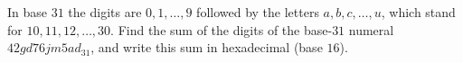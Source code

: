 In base $31$ the digits are $0,1,\ldots,9$ followed by the letters $a,b,c,\ldots,u$, which stand for $10,11,12,\ldots,30$. Find the sum of the digits of the base-$31$ numeral $42gd76jm5ad_{31}$, and write this sum in hexadecimal (base $16$).
